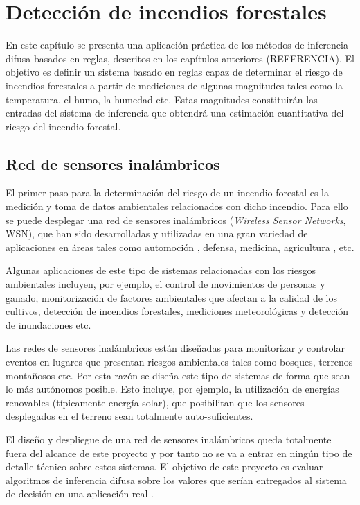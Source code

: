 \chapter{Detección de incendios forestales}
\label{cha:deteccion-incendios-forestales}
En este capítulo se presenta una aplicación práctica de los métodos de inferencia difusa basados en reglas, descritos en los capítulos anteriores (REFERENCIA). El objetivo es definir un sistema basado en reglas capaz de determinar el riesgo de incendios forestales a partir de mediciones de algunas magnitudes tales como la temperatura, el humo, la humedad etc. Estas magnitudes constituirán las entradas del sistema de inferencia que obtendrá una estimación cuantitativa del riesgo del incendio forestal.

\section{Red de sensores inalámbricos}
El primer paso para la determinación del riesgo de un incendio forestal es la medición y toma de datos ambientales relacionados con dicho incendio. Para ello se puede desplegar una red de sensores inalámbricos (\emph{Wireless Sensor Networks}, WSN), que han sido desarrolladas y utilizadas en una gran variedad de aplicaciones en áreas tales como automoción \cite{hsin2007}, defensa, medicina, agricultura \cite{tao2008}\cite{hwang2010}, etc. 

Algunas aplicaciones de este tipo de sistemas relacionadas con los riesgos ambientales incluyen, por ejemplo, el control de movimientos de personas y ganado, monitorización de factores ambientales que afectan a la calidad de los cultivos, detección de incendios forestales, mediciones meteorológicas y detección de inundaciones etc. \cite{Akyildiz2002}

Las redes de sensores inalámbricos están diseñadas para monitorizar y controlar eventos en lugares que presentan riesgos ambientales tales como bosques, terrenos montañosos etc. Por esta razón se diseña este tipo de sistemas de forma que sean lo más autónomos posible. Esto incluye, por ejemplo, la utilización de energías renovables (típicamente energía solar), que posibilitan que los sensores desplegados en el terreno sean totalmente auto-suficientes.

El diseño y despliegue de una red de sensores inalámbricos queda totalmente fuera del alcance de este proyecto y por tanto no se va a entrar en ningún tipo de detalle técnico sobre estos sistemas. El objetivo de este proyecto es evaluar algoritmos de inferencia difusa sobre los valores que serían entregados al sistema de decisión en una aplicación real . 

